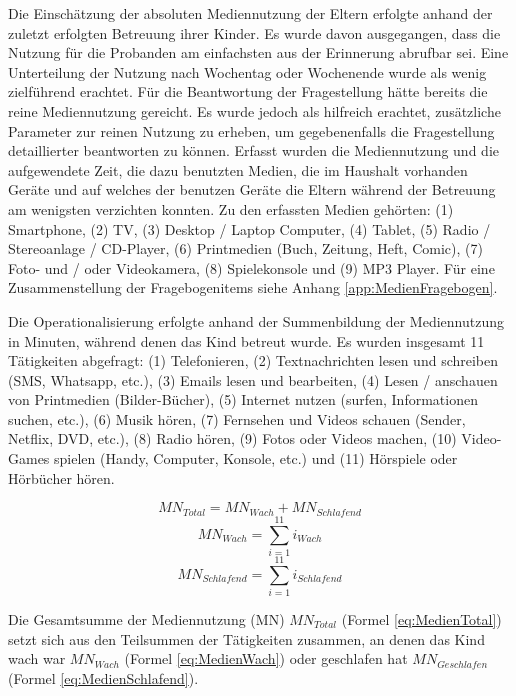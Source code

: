 Die Einschätzung der absoluten Mediennutzung der Eltern erfolgte anhand der zuletzt erfolgten Betreuung ihrer Kinder. Es wurde davon ausgegangen, dass die Nutzung für die Probanden am einfachsten aus der Erinnerung abrufbar sei. Eine Unterteilung der Nutzung nach Wochentag oder Wochenende wurde als wenig zielführend erachtet. Für die Beantwortung der Fragestellung hätte bereits die reine Mediennutzung gereicht. Es wurde jedoch als hilfreich erachtet, zusätzliche Parameter zur reinen Nutzung zu erheben, um gegebenenfalls die Fragestellung detaillierter beantworten zu können. Erfasst wurden die Mediennutzung und die aufgewendete Zeit, die dazu benutzten Medien, die im Haushalt vorhanden Geräte und auf welches der benutzen Geräte die Eltern während der Betreuung am wenigsten verzichten konnten. Zu den erfassten Medien gehörten: (1) Smartphone, (2) TV, (3) Desktop / Laptop Computer, (4) Tablet, (5) Radio / Stereoanlage / CD-Player, (6) Printmedien (Buch, Zeitung, Heft, Comic), (7) Foto- und / oder Videokamera, (8) Spielekonsole und (9) MP3 Player. Für eine Zusammenstellung der Fragebogenitems siehe Anhang \ref{app:MedienFragebogen}.

Die Operationalisierung erfolgte anhand der Summenbildung der Mediennutzung in Minuten, während denen das Kind betreut wurde. Es wurden insgesamt 11 Tätigkeiten abgefragt: (1) Telefonieren, (2) Textnachrichten lesen und schreiben (SMS, Whatsapp, etc.), (3) Emails lesen und bearbeiten, (4) Lesen / anschauen von Printmedien (Bilder-Bücher), (5) Internet nutzen (surfen, Informationen suchen, etc.), (6) Musik hören, (7) Fernsehen und Videos schauen (Sender, Netflix, DVD, etc.), (8) Radio hören, (9) Fotos oder Videos machen, (10) Video-Games spielen (Handy, Computer, Konsole, etc.) und (11) Hörspiele oder Hörbücher hören. 

\begin{equation}\label{eq:MedienTotal}
    MN_{Total}=MN_{Wach} + MN_{Schlafend}
\end{equation}
\begin{equation}\label{eq:MedienWach}
    MN_{Wach}=\sum_{i=1}^{11} i_{Wach}
\end{equation}
\begin{equation}\label{eq:MedienSchlafend}
    MN_{Schlafend}=\sum_{i=1}^{11} i_{Schlafend}
\end{equation}

Die Gesamtsumme der Mediennutzung (MN) $MN_{Total}$ (Formel \ref{eq:MedienTotal}) setzt sich aus den Teilsummen der Tätigkeiten zusammen, an denen das Kind wach war $MN_{Wach}$ (Formel \ref{eq:MedienWach}) oder geschlafen hat $MN_{Geschlafen}$ (Formel \ref{eq:MedienSchlafend}).



